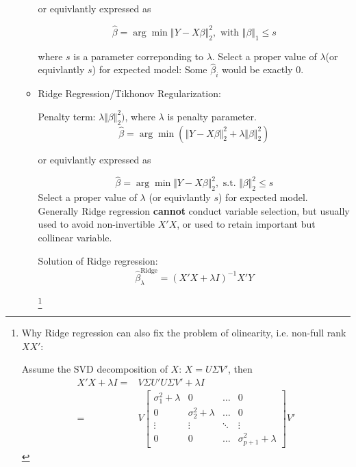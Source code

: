 \begin{itemize}[topsep=2pt,itemsep=0pt]
\begin{itemize}[topsep=2pt,itemsep=2pt]
    or equivlantly expressed as 

\begin{equation}
    \hat{\beta }=\arg\min \left\Vert Y-X\beta \right\Vert _2 ^2, \text{ with }\Vert \beta \Vert _1\leq s
\end{equation}

where $ s $ is a parameter correponding to $ \lambda  $. Select a proper value of $ \lambda  $(or equivlantly $ s $) for expected model: Some $ \hat{\beta }_i $ would be exactly $ 0 $.



\item Ridge Regression/Tikhonov Regularization:

Penalty term: $ \lambda\Vert \beta \Vert _2^2) $, where $ \lambda  $ is penalty parameter.
\begin{equation}
    \hat{\beta }=\arg\min (\Vert Y-X\beta \Vert _2 ^2+\lambda\Vert \beta \Vert _2^2)
\end{equation}

    or equivlantly expressed as 

\begin{equation}
    \hat{\beta }=\arg\min \Vert Y-X\beta \Vert _2 ^2, \text{ s.t. }\Vert \beta \Vert ^2_2\leq s
\end{equation}
Select a proper value of $ \lambda  $ (or equivlantly $ s $) for expected model. Generally Ridge regression \textbf{cannot} conduct variable selection, but usually used to avoid non-invertible $ X'X $, or used to retain important but collinear variable.

Solution of Ridge regression:
\begin{equation}
    \hat{\beta }^\mathrm{Ridge}_\lambda  =(X'X+\lambda I)^{-1}X'Y
\end{equation}

\footnote{Why Ridge regression can also fix the problem of olinearity, i.e. non-full rank $ XX' $:

Assume the SVD decomposition of $ X $: $ X=U\Sigma V' $, then 
\begin{align*}
    X'X+\lambda I=&V\Sigma U'U\Sigma V'+\lambda I\\
    =& V \begin{bmatrix}
    \sigma^2 _{1}+\lambda &0&\ldots&0\\
    0&\sigma^2 _{2}+\lambda &\ldots&0\\
    \vdots&\vdots&\ddots&\vdots\\
    0&0&\ldots&\sigma^2 _{p+1}+\lambda 
    \end{bmatrix}V'
\end{align*}

}
\end{itemize}
\end{itemize}
